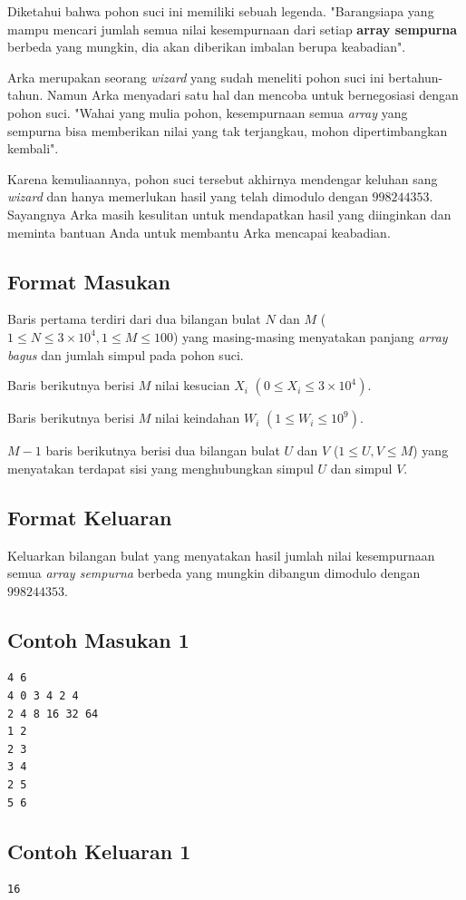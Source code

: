 \documentclass{article}
\begin{document}
Diketahui bahwa pohon suci ini memiliki sebuah legenda. "Barangsiapa yang mampu mencari jumlah semua nilai kesempurnaan dari setiap \textbf{array sempurna} berbeda yang mungkin, dia akan diberikan imbalan berupa keabadian".

Arka merupakan seorang \textit{wizard} yang sudah meneliti pohon suci ini bertahun-tahun. Namun Arka menyadari satu hal dan mencoba untuk bernegosiasi dengan pohon suci. "Wahai yang mulia pohon, kesempurnaan semua \textit{array} yang sempurna bisa memberikan nilai yang tak terjangkau, mohon dipertimbangkan kembali".

Karena kemuliaannya, pohon suci tersebut akhirnya mendengar keluhan sang \textit{wizard} dan hanya memerlukan hasil yang telah dimodulo dengan $998244353$. Sayangnya Arka masih kesulitan untuk mendapatkan hasil yang diinginkan dan meminta bantuan Anda untuk membantu Arka mencapai keabadian.


\subsection*{Format Masukan}
Baris pertama terdiri dari dua bilangan bulat $N$ dan $M$ ($1 \leq N \leq 3 \times 10^4, 1 \leq M \leq 100$) yang masing-masing menyatakan panjang \textit{array bagus} dan jumlah simpul pada pohon suci.

Baris berikutnya berisi $M$ nilai kesucian $X_{i}$ $(0 \leq X_{i} \leq 3 \times 10^4)$. 

Baris berikutnya berisi $M$ nilai keindahan $W_i$ $(1 \leq W_{i} \leq 10^9)$.

$M - 1$ baris berikutnya berisi dua bilangan bulat $U$ dan $V$ ($1 \leq U, V \leq M$) yang menyatakan terdapat sisi yang menghubungkan simpul $U$ dan simpul $V$.


\subsection*{Format Keluaran}
Keluarkan bilangan bulat yang menyatakan hasil jumlah nilai kesempurnaan semua \textit{array sempurna} berbeda yang mungkin dibangun dimodulo dengan $998244353$.

\pagebreak

\begin{multicols}{2}
\subsection*{Contoh Masukan 1}
\begin{lstlisting}
4 6
4 0 3 4 2 4
2 4 8 16 32 64
1 2
2 3
3 4
2 5
5 6

\end{lstlisting}
\columnbreak
\subsection*{Contoh Keluaran 1}
\begin{lstlisting}
16
\end{lstlisting}
\end{multicols}
\end{document}
